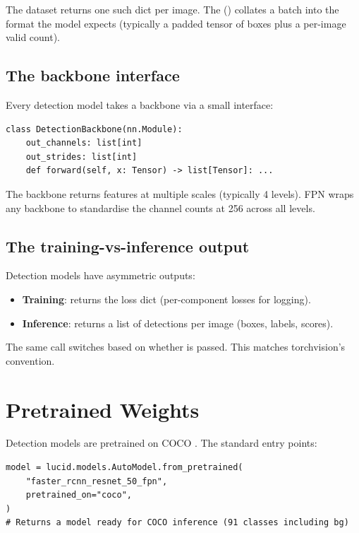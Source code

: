 The dataset returns one such dict per image. The
 () collates a batch
into the format the model expects (typically a padded tensor of
boxes plus a per-image valid count).

\subsection{The backbone interface}
\label{ssec:detection_segmentation:backbone_iface}

Every detection model takes a backbone via a small interface:

\begin{lstlisting}[style=lucid,language=LucidPython]
class DetectionBackbone(nn.Module):
    out_channels: list[int]
    out_strides: list[int]
    def forward(self, x: Tensor) -> list[Tensor]: ...
\end{lstlisting}

The backbone returns features at multiple scales (typically
4 levels). FPN wraps any backbone to standardise the channel
counts at 256 across all levels.

\subsection{The training-vs-inference output}
\label{ssec:detection_segmentation:train_vs_infer}

Detection models have asymmetric outputs:
\begin{itemize}
  \item \textbf{Training}: returns the loss dict (per-component
    losses for logging).
  \item \textbf{Inference}: returns a list of detections per
    image (boxes, labels, scores).
\end{itemize}
The same  call switches based on
whether  is passed. This matches torchvision's
convention.

\section{Pretrained Weights}
\label{sec:detection_segmentation:pretrained}

Detection models are pretrained on COCO \cite{lin_coco_2014}.
The standard entry points:

\begin{lstlisting}[style=lucid,language=LucidPython]
model = lucid.models.AutoModel.from_pretrained(
    "faster_rcnn_resnet_50_fpn",
    pretrained_on="coco",
)
# Returns a model ready for COCO inference (91 classes including bg)
\end{lstlisting}

